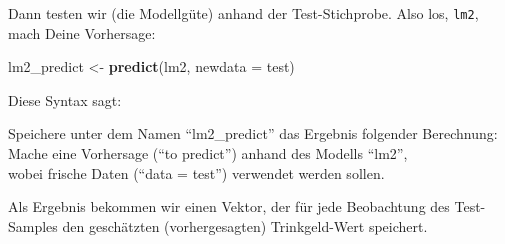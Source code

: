 \documentclass[12pt,]{book}
\makeatletter
\newenvironment{Shaded}{\begin{snugshade}}{\end{snugshade}}
\newcommand{\KeywordTok}[1]{\textcolor[rgb]{0.13,0.29,0.53}{\textbf{{#1}}}}
\newcommand{\DataTypeTok}[1]{\textcolor[rgb]{0.13,0.29,0.53}{{#1}}}
\newcommand{\DecValTok}[1]{\textcolor[rgb]{0.00,0.00,0.81}{{#1}}}
\newcommand{\StringTok}[1]{\textcolor[rgb]{0.31,0.60,0.02}{{#1}}}
\newcommand{\CommentTok}[1]{\textcolor[rgb]{0.56,0.35,0.01}{\textit{{#1}}}}
\newcommand{\OtherTok}[1]{\textcolor[rgb]{0.56,0.35,0.01}{{#1}}}
\newcommand{\NormalTok}[1]{{#1}}
\newenvironment{kframe}{%
\medskip{}
\setlength{\fboxsep}{.8em}
 \def\at@end@of@kframe{}%
 \ifinner\ifhmode%
  \def\at@end@of@kframe{\end{minipage}}%
  \begin{minipage}{\columnwidth}%
 \fi\fi%
 \def\FrameCommand##1{\hskip\@totalleftmargin \hskip-\fboxsep
 \colorbox{shadecolor}{##1}\hskip-\fboxsep
     \hskip-\linewidth \hskip-\@totalleftmargin \hskip\columnwidth}%
 \MakeFramed {\advance\hsize-\width
   \@totalleftmargin\z@ \linewidth\hsize
   \@setminipage}}%
 {\par\unskip\endMakeFramed%
 \at@end@of@kframe}
\renewenvironment{Shaded}{\begin{kframe}}{\end{kframe}}
\let\BeginKnitrBlock\begin \let\EndKnitrBlock\end
\makeatother
\begin{document}
\begin{Shaded}
\end{Shaded}

Dann testen wir (die Modellgüte) anhand der Test-Stichprobe. Also los,
\texttt{lm2}, mach Deine Vorhersage:

\begin{Shaded}
\begin{Highlighting}[]
\NormalTok{lm2_predict <-}\StringTok{ }\KeywordTok{predict}\NormalTok{(lm2, }\DataTypeTok{newdata =} \NormalTok{test)}
\end{Highlighting}
\end{Shaded}

Diese Syntax sagt:

\BeginKnitrBlock{rmdpseudocode}
Speichere unter dem Namen ``lm2\_predict'' das Ergebnis folgender
Berechnung:\\
Mache eine Vorhersage (``to predict'') anhand des Modells ``lm2'',\\
wobei frische Daten (``data = test'') verwendet werden sollen.
\EndKnitrBlock{rmdpseudocode}

Als Ergebnis bekommen wir einen Vektor, der für jede Beobachtung des
Test-Samples den geschätzten (vorhergesagten) Trinkgeld-Wert speichert.

\begin{Shaded}
\end{Shaded}
\end{document}
